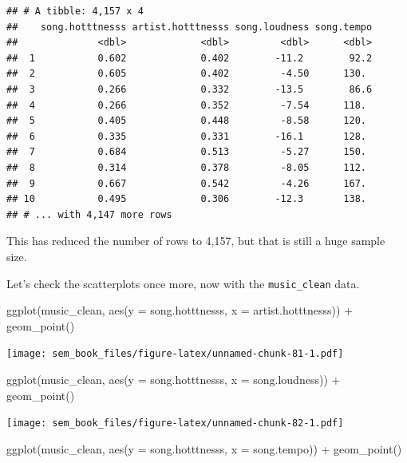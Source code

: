 \documentclass[
]{book}
\newenvironment{Shaded}{\begin{snugshade}}{\end{snugshade}}
\newcommand{\AttributeTok}[1]{\textcolor[rgb]{0.77,0.63,0.00}{#1}}
\newcommand{\FunctionTok}[1]{\textcolor[rgb]{0.00,0.00,0.00}{#1}}
\newcommand{\NormalTok}[1]{#1}
\newcommand{\SpecialCharTok}[1]{\textcolor[rgb]{0.00,0.00,0.00}{#1}}
\begin{document}
\begin{verbatim}
## # A tibble: 4,157 x 4
##    song.hotttnesss artist.hotttnesss song.loudness song.tempo
##              <dbl>             <dbl>         <dbl>      <dbl>
##  1           0.602             0.402        -11.2        92.2
##  2           0.605             0.402         -4.50      130. 
##  3           0.266             0.332        -13.5        86.6
##  4           0.266             0.352         -7.54      118. 
##  5           0.405             0.448         -8.58      120. 
##  6           0.335             0.331        -16.1       128. 
##  7           0.684             0.513         -5.27      150. 
##  8           0.314             0.378         -8.05      112. 
##  9           0.667             0.542         -4.26      167. 
## 10           0.495             0.306        -12.3       138. 
## # ... with 4,147 more rows
\end{verbatim}

This has reduced the number of rows to 4,157, but that is still a huge sample size.

Let's check the scatterplots once more, now with the \texttt{music\_clean} data.

\begin{Shaded}
\begin{Highlighting}[]
\FunctionTok{ggplot}\NormalTok{(music\_clean, }\FunctionTok{aes}\NormalTok{(}\AttributeTok{y =}\NormalTok{ song.hotttnesss,}
                        \AttributeTok{x =}\NormalTok{ artist.hotttnesss)) }\SpecialCharTok{+}
    \FunctionTok{geom\_point}\NormalTok{()}
\end{Highlighting}
\end{Shaded}

\texttt{[image: sem\_book\_files/figure-latex/unnamed-chunk-81-1.pdf]}

\begin{Shaded}
\begin{Highlighting}[]
\FunctionTok{ggplot}\NormalTok{(music\_clean, }\FunctionTok{aes}\NormalTok{(}\AttributeTok{y =}\NormalTok{ song.hotttnesss,}
                        \AttributeTok{x =}\NormalTok{ song.loudness)) }\SpecialCharTok{+}
    \FunctionTok{geom\_point}\NormalTok{()}
\end{Highlighting}
\end{Shaded}

\texttt{[image: sem\_book\_files/figure-latex/unnamed-chunk-82-1.pdf]}

\begin{Shaded}
\begin{Highlighting}[]
\FunctionTok{ggplot}\NormalTok{(music\_clean, }\FunctionTok{aes}\NormalTok{(}\AttributeTok{y =}\NormalTok{ song.hotttnesss,}
                        \AttributeTok{x =}\NormalTok{ song.tempo)) }\SpecialCharTok{+}
    \FunctionTok{geom\_point}\NormalTok{()}
\end{Highlighting}
\end{Shaded}
\end{document}
